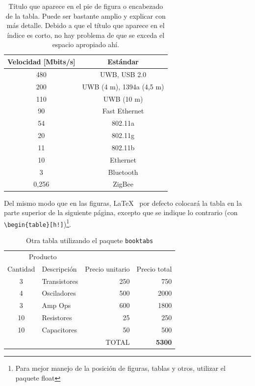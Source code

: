 \begin{table}
\caption[Título en el índice]{Título que aparece en el pie de figura o encabezado de la tabla. Puede ser bastante amplio y explicar con más detalle. Debido a que el título que aparece en el índice es corto, no hay problema de que se exceda el espacio apropiado ahí.}
\label{T:ejemploconlineas}
\begin{center}
\begin{tabular}{| c | c |}
\hline
\textbf{Velocidad [Mbits/s]} & \textbf{Estándar} \\ 
\hline
480 & UWB, USB 2.0 \\ 
200 & UWB (4 m), 1394a (4,5 m) \\
110 & UWB (10 m) \\ 
90 & Fast Ethernet \\ 
54 & 802.11a \\ 
20 & 802.11g \\ 
11 & 802.11b \\ 
10 & Ethernet \\ 
3 & Bluetooth \\ 
0,256 & ZigBee \\ 
\hline
\end{tabular}
\end{center}
\end{table}

Del mismo modo que en las figuras, \LaTeX~ por defecto colocará la tabla en la parte superior de la siguiente página, excepto que se indique lo contrario (con \verb+\begin{table}[h!]+)\footnote{Para mejor manejo de la posición de figuras, tablas y otros, utilizar el paquete \textsf{float}}.

\begin{table}
\caption{Otra tabla utilizando el paquete \texttt{booktabs}}
\label{T:otratabla}
\centering
\begin{tabular}{c l r r}
\toprule
\multicolumn{2}{c}{Producto} \\
\cmidrule(r){1-2}
Cantidad & Descripción & Precio unitario & Precio total  \\
\midrule
3  & Transistores 	& 250	& 750	\\
4  & Osciladores   	& 500   & 2000 \\
3  & Amp Ops     	& 600   & 1800	\\
10 & Resistores  	& 25    & 250	\\
10 & Capacitores	& 50 	& 500	\\
\midrule 
\multicolumn{3}{r}{TOTAL} & \textbf{5300} \\
\bottomrule
\end{tabular}
\end{table}

